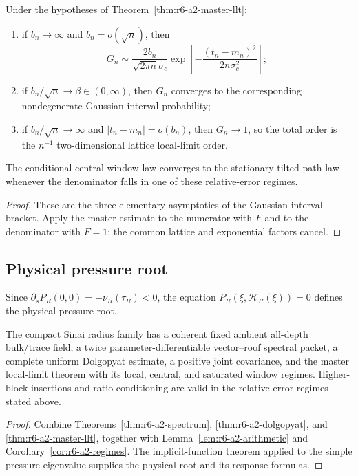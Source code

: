 \begin{corollary}
\label{cor:r6-a2-regimes}
Under the hypotheses of Theorem~\ref{thm:r6-a2-master-llt}:
\begin{enumerate}[label=(\roman*)]
\item if \(b_n\to\infty\) and \(b_n=o(\sqrt n)\), then
\[
G_n\sim\frac{2b_n}{\sqrt{2\pi n}\sigma_c}
\exp\left[-\frac{(t_n-m_n)^2}{2n\sigma_c^2}\right];
\]
\item if \(b_n/\sqrt n\to\beta\in(0,\infty)\), then \(G_n\) converges to
the corresponding nondegenerate Gaussian interval probability;
\item if \(b_n/\sqrt n\to\infty\) and
\(|t_n-m_n|=o(b_n)\), then \(G_n\to1\), so the total order is the
\(n^{-1}\) two-dimensional lattice local-limit order.
\end{enumerate}
The conditional central-window law converges to the stationary tilted path
law whenever the denominator falls in one of these relative-error regimes.
\end{corollary}

\begin{proof}
These are the three elementary asymptotics of the Gaussian interval bracket.
Apply the master estimate to the numerator with \(F\) and to the denominator
with \(F=1\); the common lattice and exponential factors cancel.
\end{proof}

\subsection{Physical pressure root}

Since \(\partial_sP_R(0,0)=-\nu_R(\tau_R)<0\), the equation
\(P_R(\xi,\mathcal H_R(\xi))=0\) defines the physical pressure root.

\begin{theorem}
\label{thm:r6-a2-main}
The compact Sinai radius family has a coherent fixed ambient all-depth
bulk/trace field, a twice parameter-differentiable vector--roof spectral
packet, a complete uniform Dolgopyat estimate, a positive joint covariance,
and the master local-limit theorem with its local, central, and saturated
window regimes.  Higher-block insertions and ratio conditioning are valid in
the relative-error regimes stated above.
\end{theorem}

\begin{proof}
Combine Theorems~\ref{thm:r6-a2-spectrum},
\ref{thm:r6-a2-dolgopyat}, and
\ref{thm:r6-a2-master-llt}, together with
Lemma~\ref{lem:r6-a2-arithmetic} and
Corollary~\ref{cor:r6-a2-regimes}.  The implicit-function theorem applied to
the simple pressure eigenvalue supplies the physical root and its response
formulas.
\end{proof}
